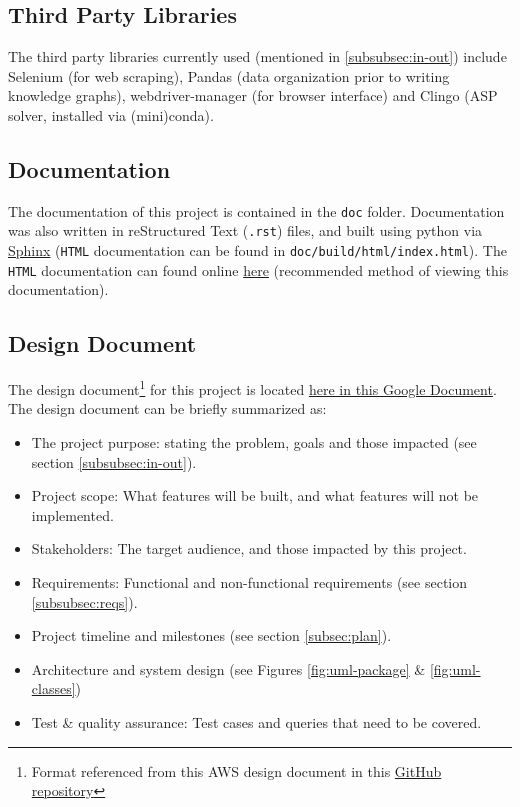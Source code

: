 \documentclass[12pt]{article}
\def \docLink{https://cse505.readthedocs.io/en/latest/?badge=latest}
\def \desDocLink{https://docs.google.com/document/d/1t48in8rdzC_VOijfAOP23C_YgAQxkow5eaE7AXEVUYM/edit?usp=sharing}
\begin{document}
    \subsection{Third Party Libraries}
    \label{subsec:thirdparty}

    The third party libraries currently used (mentioned in \ref{subsubsec:in-out}) include Selenium (for web scraping), Pandas (data organization prior to writing knowledge graphs), webdriver-manager (for browser interface) and Clingo (ASP solver, installed via (mini)conda).

    \subsection{Documentation}
    \label{subsec:docs}

    The documentation of this project is contained in the {\tt{doc}} folder. Documentation was also written in reStructured Text ({\tt{.rst}}) files, and built using python via \href{https://www.sphinx-doc.org/en/master/}{Sphinx} ({\tt{HTML}} documentation can be found in {\tt{doc/build/html/index.html}}). The {\tt{HTML}} documentation can found online \href{\docLink}{here} (recommended method of viewing this documentation).

    \subsection{Design Document}
    \label{subsec:design-docs}

    The design document\footnote{Format referenced from this AWS design document in this \href{https://github.com/aws/aws-sam-cli/blob/develop/designs/intrinsics_design.md}{GitHub repository}} for this project is located \href{\desDocLink}{here in this Google Document}. The design document can be briefly summarized as:

    \begin{itemize}
        \item The project purpose: stating the problem, goals and those impacted (see section \ref{subsubsec:in-out}).
        \item Project scope: What features will be built, and what features will not be implemented.
        \item Stakeholders: The target audience, and those impacted by this project.
        \item Requirements: Functional and non-functional requirements (see section \ref{subsubsec:reqs}).
        \item Project timeline and milestones (see section \ref{subsec:plan}).
        \item Architecture and system design (see Figures \ref{fig:uml-package} \& \ref{fig:uml-classes})
        \item Test \& quality assurance: Test cases and queries that need to be covered.
    \end{itemize}
    
\end{document}
